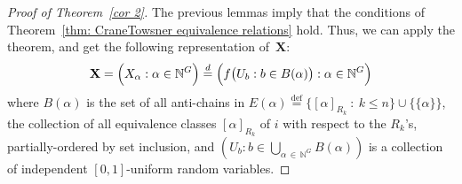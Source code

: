 \documentclass[AHL,Unicode,longabstracts,published]{cedram}
\newcommand*{\defeq}{\stackrel{\mathrm{def}}{=}}
\renewcommand{\d}{\buildrel{d}\over{=}}
\newcommand*\N{\mathbb{N}}
\newcommand*\bX{\mathbf{X}}
\newcommand*\N{\mathbb{N}}
\begin{document}
\begin{proof}[Proof of Theorem~\ref{cor 2}] The previous lemmas imply that the conditions of Theorem~\ref{thm: CraneTowsner equivalence relations} hold. Thus, we can apply the theorem, and get the following representation of~$\bX$:
\begin{equation}\label{eqn:CT-representation:1}
\bX = \Big(X_\alpha : \alpha \in \N^G\Big) \d \Big(f\big(U_b : b \in B(\alpha)\big) : \alpha \in \N^G\Big)
\end{equation}
where $B(\alpha)$ is the set of all anti-chains in $E(\alpha)
\defeq \{[\alpha]_{R_k}~:~k\leq n\}\cup\{\{\alpha\}\}$, the collection of all equivalence classes $[\alpha]_{R_k}$ of $i$ with respect to the $R_k$'s, partially-ordered by set inclusion, and $(U_b : b \in \bigcup_{\alpha\,\in\,\N^G} B(\alpha))$ is a collection of independent $[0,1]$-uniform random variables.


\end{proof}
\end{document}
